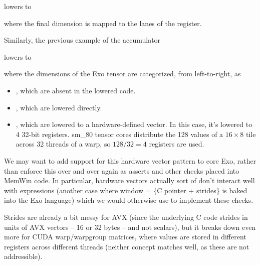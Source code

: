 
lowers to


where the final  dimension is mapped to the lanes of the  register.

\filbreak
Similarly, the previous example of the  accumulator


lowers to


where the dimensions of the Exo  tensor are categorized, from left-to-right, as

\filbreak
\begin{itemize}
  \item {} \lighttt{[\violetBox{4}, \greenBox{2},...}, which are absent in the lowered code.
  \filbreak
  \item {} , which are lowered directly.
  \filbreak
  \item {} \lighttt{..., \blueBox{16, 8}]}, which are lowered to a hardware-defined vector. In this case, it's lowered to 4 32-bit registers. sm\_80 tensor cores distribute the 128 values of a $16 \times 8$ tile across 32 threads of a warp, so $128 / 32 = 4$ registers are used.
\end{itemize}

\filbreak
We may want to add support for this hardware vector pattern to core Exo, rather than enforce this over and over again as asserts and other checks placed into MemWin code.
In particular, hardware vectors actually sort of don't interact well with  expressions (another case where window = \{C pointer + strides\} is baked into the Exo language) which we would otherwise use to implement these checks.

\filbreak
Strides are already a bit messy for AVX (since the underlying C code strides in units of AVX vectors -- 16 or 32 bytes -- and not scalars), but it breaks down even more for CUDA warp/warpgroup matrices, where values are stored in different registers across different threads (neither concept matches  well, as these are not addressible).

\filbreak
{}


